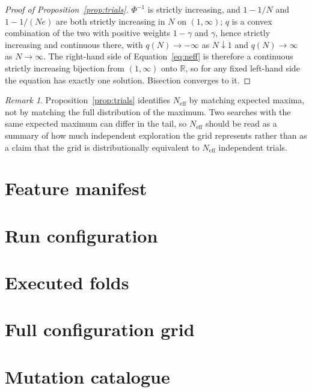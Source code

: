 \documentclass{article}
\theoremstyle{plain}
\theoremstyle{remark}
\newtheorem{remark}{Remark}
\begin{document}
\begin{proof}[Proof of Proposition~\ref{prop:trials}]
$\Phi^{-1}$ is strictly increasing, and $1 - 1/N$ and $1 - 1/(Ne)$ are both
strictly increasing in $N$ on $(1,\infty)$; $q$ is a convex combination of the
two with positive weights $1-\gamma$ and $\gamma$, hence strictly increasing and
continuous there, with $q(N) \to -\infty$ as $N \downarrow 1$ and $q(N) \to
\infty$ as $N \to \infty$. The right-hand side of Equation~\ref{eq:neff} is
therefore a continuous strictly increasing bijection from $(1,\infty)$ onto
$\mathbb{R}$, so for any fixed left-hand side the equation has exactly one
solution. Bisection converges to it. \end{proof}

\begin{remark}
Proposition~\ref{prop:trials} identifies $N_{\mathrm{eff}}$ by matching expected
maxima, not by matching the full distribution of the maximum. Two searches with
the same expected maximum can differ in the tail, so $N_{\mathrm{eff}}$ should be
read as a summary of how much independent exploration the grid represents rather
than as a claim that the grid is distributionally equivalent to
$N_{\mathrm{eff}}$ independent trials.
\end{remark}

\section{Feature manifest}
\label{app:features}



\section{Run configuration}
\label{app:configuration}



\section{Executed folds}
\label{app:folds}



\section{Full configuration grid}
\label{app:grid}



\section{Mutation catalogue}
\label{app:mutations}


\end{document}
